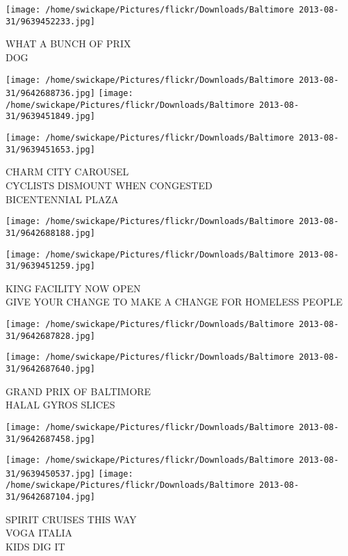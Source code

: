 \documentclass[10pt,letterpaper]{article}
\begin{document}
\vspace{0.25in}
\texttt{[image: /home/swickape/Pictures/flickr/Downloads/Baltimore 2013-08-31/9639452233.jpg]}

WHAT A BUNCH OF PRIX\\
DOG
\pagebreak

\texttt{[image: /home/swickape/Pictures/flickr/Downloads/Baltimore 2013-08-31/9642688736.jpg]}
\texttt{[image: /home/swickape/Pictures/flickr/Downloads/Baltimore 2013-08-31/9639451849.jpg]}

\texttt{[image: /home/swickape/Pictures/flickr/Downloads/Baltimore 2013-08-31/9639451653.jpg]}

CHARM CITY CAROUSEL\\
CYCLISTS DISMOUNT WHEN CONGESTED\\
BICENTENNIAL PLAZA
\pagebreak

\texttt{[image: /home/swickape/Pictures/flickr/Downloads/Baltimore 2013-08-31/9642688188.jpg]}

\vspace{0.25in}
\texttt{[image: /home/swickape/Pictures/flickr/Downloads/Baltimore 2013-08-31/9639451259.jpg]}

KING FACILITY NOW OPEN\\
GIVE YOUR CHANGE TO MAKE A CHANGE FOR HOMELESS PEOPLE
\pagebreak

\texttt{[image: /home/swickape/Pictures/flickr/Downloads/Baltimore 2013-08-31/9642687828.jpg]}

\vspace{0.25in}
\texttt{[image: /home/swickape/Pictures/flickr/Downloads/Baltimore 2013-08-31/9642687640.jpg]}

GRAND PRIX OF BALTIMORE\\
HALAL GYROS SLICES
\pagebreak

\texttt{[image: /home/swickape/Pictures/flickr/Downloads/Baltimore 2013-08-31/9642687458.jpg]}

\vspace{0.25in}
\texttt{[image: /home/swickape/Pictures/flickr/Downloads/Baltimore 2013-08-31/9639450537.jpg]}
\texttt{[image: /home/swickape/Pictures/flickr/Downloads/Baltimore 2013-08-31/9642687104.jpg]}

SPIRIT CRUISES THIS WAY\\
VOGA ITALIA\\
KIDS DIG IT
\pagebreak
\end{document}
